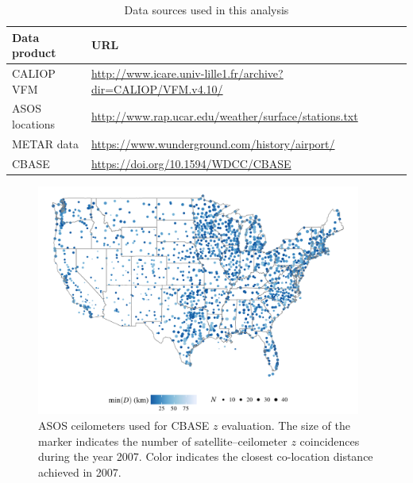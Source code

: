\documentclass[essd,manuscript]{copernicus}\usepackage[]{graphicx}\usepackage[]{color}
\newenvironment{knitrout}{}{} %
\newcommand\CBH{\ensuremath{z}}
\begin{document}
\begin{table}
  \centering
  \caption{Data sources used in this analysis}
  \begin{tabular}{ll}
    \hline\hline
    Data product & URL  \\\hline
    CALIOP VFM & \url{http://www.icare.univ-lille1.fr/archive?dir=CALIOP/VFM.v4.10/} \\
    ASOS locations & \url{http://www.rap.ucar.edu/weather/surface/stations.txt}\\
    METAR data & \url{https://www.wunderground.com/history/airport/}\footnotemark[1] \\
    CBASE & \url{https://doi.org/10.1594/WDCC/CBASE} \\
    \hline\hline
  \end{tabular}
  \label{tab:data}
\end{table}
\begin{figure}
  \centering
\begin{knitrout}
\color{fgcolor}

{\centering \includegraphics[width=0.95\textwidth]{figure/method-eval-asos-1} 

}



\end{knitrout}
  \caption{ASOS ceilometers used for CBASE \CBH{} evaluation.  The size of the
    marker indicates the number of satellite--ceilometer \CBH{} coincidences during
    the year 2007.  Color indicates the closest co-location distance achieved in
    2007.}
  \label{fig:asos}
\end{figure}
\end{document}
